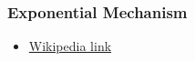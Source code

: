 \documentclass{article}
\begin{document}
\subsubsection{Exponential Mechanism}

\begin{itemize}
    \item \href{https://en.wikipedia.org/wiki/Exponential_mechanism_(differential_privacy)}{Wikipedia link}
\end{itemize}
\end{document}
